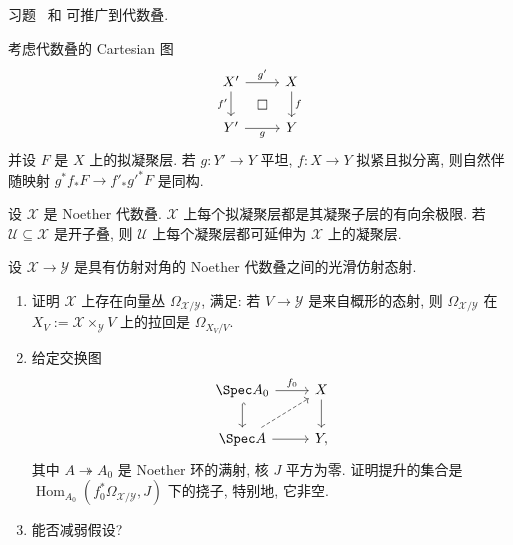 习题~ 和  可推广到代数叠.
\begin{proposition}[平坦基变换]\label{src:7.1.14}
考虑代数叠的 Cartesian 图
\[
\begin{tikzcd}[ampersand replacement=\&]
X'\arrow[r,"{g'}"]\arrow[d,"{f'}"']\&X\arrow[d,"{f}"]\\
Y'\arrow[r,"{g}"']\arrow[ur,phantom,"{\square}"]\&Y
\end{tikzcd}
\]
并设 $F$ 是 $X$ 上的拟凝聚层. 若 $g:Y'\to Y$ 平坦, $f:X\to Y$ 拟紧且拟分离, 则自然伴随映射 $g^*f_*F\to f'_*g'^*F$ 是同构.
\end{proposition}
\begin{proposition}\label{src:7.1.15}
设 $\mathcal X$ 是 Noether 代数叠. $\mathcal X$ 上每个拟凝聚层都是其凝聚子层的有向余极限. 若 $\mathcal U\subseteq\mathcal X$ 是开子叠, 则 $\mathcal U$ 上每个凝聚层都可延伸为 $\mathcal X$ 上的凝聚层.
\end{proposition}
\begin{exercise}\label{src:7.1.16}
设 $\mathcal X\to\mathcal Y$ 是具有仿射对角的 Noether 代数叠之间的光滑仿射态射.
\begin{enumerate}[(1)]
\item 证明 $\mathcal X$ 上存在向量丛 $\Omega_{\mathcal X/\mathcal Y}$, 满足: 若 $V\to\mathcal Y$ 是来自概形的态射, 则 $\Omega_{\mathcal X/\mathcal Y}$ 在 $X_V:=\mathcal X\times_{\mathcal Y}V$ 上的拉回是 $\Omega_{X_V/V}$.
\item 给定交换图
\[
\begin{tikzcd}[ampersand replacement=\&]
\Spec A_0\arrow[r,"{f_0}"]\arrow[d,hook]\&\mathcal X\arrow[d]\\
\Spec A\arrow[r]\arrow[ur,dashed]\&\mathcal Y,
\end{tikzcd}
\]
其中 $A\twoheadrightarrow A_0$ 是 Noether 环的满射, 核 $J$ 平方为零. 证明提升的集合是 $\operatorname{Hom}_{A_0}(f_0^*\Omega_{\mathcal X/\mathcal Y},J)$ 下的挠子, 特别地, 它非空.
\item 能否减弱假设?
\end{enumerate}
\end{exercise}
